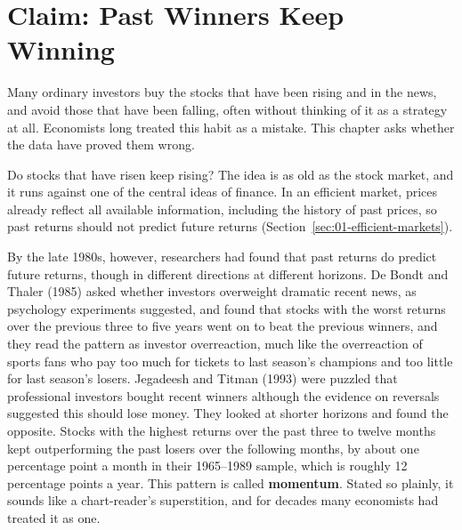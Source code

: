 \makeatletter
{}
\makeatother

\chapter{Claim: Past Winners Keep Winning}
\label{ch:04}

Many ordinary investors buy the stocks that have been rising and in the news, and avoid those that have been falling, often without thinking of it as a strategy at all. Economists long treated this habit as a mistake. This chapter asks whether the data have proved them wrong.

Do stocks that have risen keep rising? The idea is as old as the stock market, and it runs against one of the central ideas of finance. In an efficient market, prices already reflect all available information, including the history of past prices, so past returns should not predict future returns (Section~\ref{sec:01-efficient-markets}). 

By the late 1980s, however, researchers had found that past returns do predict future returns, though in different directions at different horizons. De Bondt and Thaler (1985) asked whether investors overweight dramatic recent news, as psychology experiments suggested, and found that stocks with the worst returns over the previous three to five years went on to beat the previous winners, and they read the pattern as investor overreaction, much like the overreaction of sports fans who pay too much for tickets to last season's champions and too little for last season's losers. Jegadeesh and Titman (1993) were puzzled that professional investors bought recent winners although the evidence on reversals suggested this should lose money. They looked at shorter horizons and found the opposite. Stocks with the highest returns over the past three to twelve months kept outperforming the past losers over the following months, by about one percentage point a month in their 1965--1989 sample, which is roughly 12 percentage points a year. This pattern is called \textbf{momentum}. Stated so plainly, it sounds like a chart-reader's superstition, and for decades many economists had treated it as one.


